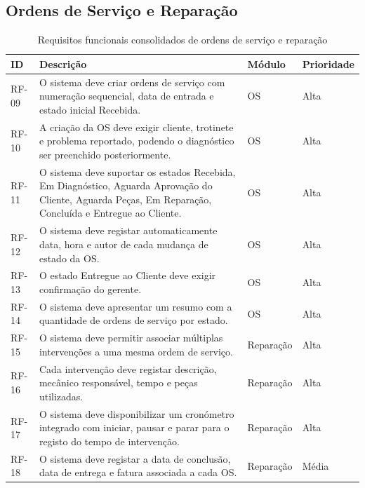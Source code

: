 \documentclass[a4paper,12pt]{scrreprt}
\begin{document}
        \subsection{Ordens de Serviço e Reparação}
        \begin{table}[H]
            \centering
            \small
            \begin{tabular}{|p{1.4cm}|p{8.9cm}|p{2.5cm}|p{2.1cm}|}
                \hline
                \rowcolor{gray!20!white}
                \textbf{ID} & \textbf{Descrição} & \textbf{Módulo} & \textbf{Prioridade} \\
                \hline
                RF-09 & O sistema deve criar ordens de serviço com numeração sequencial, data de entrada e estado inicial Recebida. & OS & Alta \\
                \hline
                RF-10 & A criação da OS deve exigir cliente, trotinete e problema reportado, podendo o diagnóstico ser preenchido posteriormente. & OS & Alta \\
                \hline
                RF-11 & O sistema deve suportar os estados Recebida, Em Diagnóstico, Aguarda Aprovação do Cliente, Aguarda Peças, Em Reparação, Concluída e Entregue ao Cliente. & OS & Alta \\
                \hline
                RF-12 & O sistema deve registar automaticamente data, hora e autor de cada mudança de estado da OS. & OS & Alta \\
                \hline
                RF-13 & O estado Entregue ao Cliente deve exigir confirmação do gerente. & OS & Alta \\
                \hline
                RF-14 & O sistema deve apresentar um resumo com a quantidade de ordens de serviço por estado. & OS & Alta \\
                \hline
                RF-15 & O sistema deve permitir associar múltiplas intervenções a uma mesma ordem de serviço. & Reparação & Alta \\
                \hline
                RF-16 & Cada intervenção deve registar descrição, mecânico responsável, tempo e peças utilizadas. & Reparação & Alta \\
                \hline
                RF-17 & O sistema deve disponibilizar um cronómetro integrado com iniciar, pausar e parar para o registo do tempo de intervenção. & Reparação & Alta \\
                \hline
                RF-18 & O sistema deve registar a data de conclusão, data de entrega e fatura associada a cada OS. & Reparação & Média \\
                \hline
            \end{tabular}
            \caption{Requisitos funcionais consolidados de ordens de serviço e reparação}
        \end{table}
\end{document}
